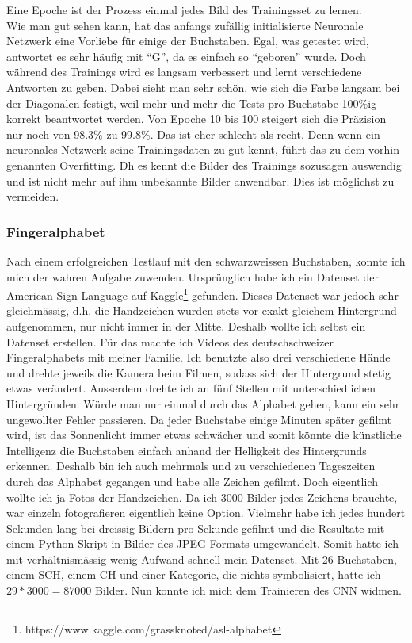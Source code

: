 \documentclass[11pt,a4paper,ngerman]{article}
\begin{document}
Eine Epoche ist der Prozess einmal jedes Bild des Trainingsset zu lernen.\\

Wie man gut sehen kann, hat das anfangs zufällig initialisierte Neuronale Netzwerk eine Vorliebe für einige der Buchstaben. Egal, was getestet wird, antwortet es sehr häufig mit \enquote{G}, da es einfach so \enquote{geboren} wurde. Doch während des Trainings wird es langsam verbessert und lernt verschiedene Antworten zu geben. Dabei sieht man sehr schön, wie sich die Farbe langsam bei der Diagonalen festigt, weil mehr und mehr die Tests pro Buchstabe 100\%ig korrekt beantwortet werden. Von Epoche 10 bis 100 steigert sich die Präzision nur noch von 98.3\% zu 99.8\%. Das ist eher schlecht als recht. Denn wenn ein neuronales Netzwerk seine Trainingsdaten zu gut kennt, führt das zu dem vorhin genannten Overfitting. Dh es kennt die Bilder des Trainings sozusagen auswendig und ist nicht mehr auf ihm unbekannte Bilder anwendbar. Dies ist möglichst zu vermeiden.

\subsubsection{Fingeralphabet}

Nach einem erfolgreichen Testlauf mit den schwarzweissen Buchstaben, konnte ich mich der wahren Aufgabe zuwenden. Ursprünglich habe ich ein Datenset der American Sign Language auf Kaggle\footnote{https://www.kaggle.com/grassknoted/asl-alphabet} gefunden. Dieses Datenset war jedoch sehr gleichmässig, d.h. die Handzeichen wurden stets vor exakt gleichem Hintergrund aufgenommen, nur nicht immer in der Mitte. Deshalb wollte ich selbst ein Datenset erstellen. Für das machte ich Videos des deutschschweizer Fingeralphabets mit meiner Familie. Ich benutzte also drei verschiedene Hände und drehte jeweils die Kamera beim Filmen, sodass sich der Hintergrund stetig etwas verändert. Ausserdem drehte ich an fünf Stellen mit unterschiedlichen Hintergründen. Würde man nur einmal durch das Alphabet gehen, kann ein sehr ungewollter Fehler passieren. Da jeder Buchstabe einige Minuten später gefilmt wird, ist das Sonnenlicht immer etwas schwächer und somit könnte die künstliche Intelligenz die Buchstaben einfach anhand der Helligkeit des Hintergrunds erkennen. Deshalb bin ich auch mehrmals und zu verschiedenen Tageszeiten durch das Alphabet gegangen und habe alle Zeichen gefilmt. Doch eigentlich wollte ich ja Fotos der Handzeichen. Da ich 3000 Bilder jedes Zeichens brauchte, war einzeln fotografieren eigentlich keine Option. Vielmehr habe ich jedes hundert Sekunden lang bei dreissig Bildern pro Sekunde gefilmt und die Resultate mit einem Python-Skript in Bilder des JPEG-Formats umgewandelt. Somit hatte ich mit verhältnismässig wenig Aufwand schnell mein Datenset. Mit 26 Buchstaben, einem SCH, einem CH und einer Kategorie, die nichts symbolisiert, hatte ich $ 29*3000 = 87000 $ Bilder. Nun konnte ich mich dem Trainieren des CNN widmen.\\
\end{document}
